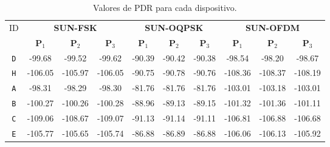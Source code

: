 \begin{table}[ht]
      \centering
      \caption{Valores de PDR para cada dispositivo.}
      \begin{tabular}{|c|c|c|c|c|c|c|c|c|c|}
            \hline
            ID         & \multicolumn{3}{c|}{\textbf{SUN-FSK}} & \multicolumn{3}{c|}{\textbf{SUN-OQPSK}} & \multicolumn{3}{c|}{\textbf{SUN-OFDM}}                                                                                                       \\ \cline{2-10}
                       & \textbf{P$_1$}                        & \textbf{P$_2$}                          & \textbf{P$_3$}                         & \textbf{P$_1$} & \textbf{P$_2$} & \textbf{P$_3$} & \textbf{P$_1$} & \textbf{P$_2$} & \textbf{P$_3$} \\ \hline
            \texttt{D} & -99.68                                & -99.52                                  & -99.62                                 & -90.39         & -90.42         & -90.38         & -98.54         & -98.20         & -98.67         \\ \hline
            \texttt{H} & -106.05                               & -105.97                                 & -106.05                                & -90.75         & -90.78         & -90.76         & -108.36        & -108.37        & -108.19        \\ \hline
            \texttt{A} & -98.31                                & -98.29                                  & -98.30                                 & -81.76         & -81.76         & -81.76         & -103.01        & -103.18        & -103.01        \\ \hline
            \texttt{B} & -100.27                               & -100.26                                 & -100.28                                & -88.96         & -89.13         & -89.15         & -101.32        & -101.36        & -101.11        \\ \hline
            \texttt{C} & -109.06                               & -108.67                                 & -109.07                                & -91.13         & -91.14         & -91.11         & -106.81        & -106.88        & -106.68        \\ \hline
            \texttt{E} & -105.77                               & -105.65                                 & -105.74                                & -86.88         & -86.89         & -86.88         & -106.06        & -106.13        & -105.92        \\ \hline

\end{tabular}
\end{table}
